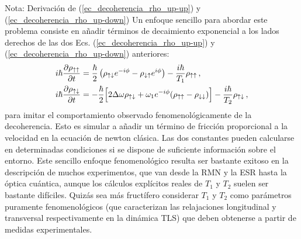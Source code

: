 \documentclass[a4paper,11pt]{book} %
\numberwithin{equation}{chapter}
\def\lp{\left(}
\def\rp{\right)}
\def\Lc{\Bigl[}
\def\Rc{\Bigr]}
\begin{document}
\begin{mybox_blue}{Nota: Derivación de (\ref{ec_decoherencia_rho_up-up}) y  (\ref{ec_decoherencia_rho_up-down})}
Un enfoque sencillo para abordar este problema consiste en añadir términos de decaimiento exponencial a los lados derechos de las dos Ecs. (\ref{ec_decoherencia_rho_up-up}) y (\ref{ec_decoherencia_rho_up-down}) anteriores:
	\begin{align}
	i \hbar \frac{\partial \rho_{\uparrow \uparrow}}{\partial t} & = \frac{\hbar}{2} \lp \rho_{\uparrow \downarrow} e^{-i \phi} - \rho_{\downarrow \uparrow} e^{i \phi} \rp - \frac{i \hbar}{T_1} \rho_{\uparrow \uparrow} \, , \label{ec_decoherencia_rho_up-up_ficcion} \\
	i \hbar \frac{\partial \rho_{\uparrow \downarrow}}{\partial t} & = 
	- \frac{\hbar}{2} \Lc 2 \Delta \omega \rho_{\uparrow \downarrow} + 
	\omega_1 e^{-i \phi} (\rho_{\uparrow \uparrow} - \rho_{\downarrow \downarrow}) \Rc - \frac{i \hbar}{T_2}  \rho_{\uparrow \downarrow} \, , \label{ec_decoherencia_rho_up-down_ficcion}
	\end{align}
para imitar el comportamiento observado fenomenológicamente de la decoherencia. Esto es simular a añadir un término de fricción proporcional a la velocidad en la ecuación de newton clásica. Las dos constantes pueden calcularse en determinadas condiciones si se dispone de suficiente información sobre el entorno. Este sencillo enfoque fenomenológico resulta ser bastante exitoso en la descripción de muchos experimentos, que van desde la RMN y la ESR hasta la óptica cuántica, aunque los cálculos explícitos reales de $T_1$ y $T_2$ suelen ser bastante difíciles. Quizás sea más fructífero considerar $T_1$ y $T_2$ como parámetros puramente fenomenológicos (que caracterizan las relajaciones longitudinal y transversal respectivamente en la dinámica TLS) que deben obtenerse a partir de medidas experimentales.


\end{mybox_blue}
\end{document}

